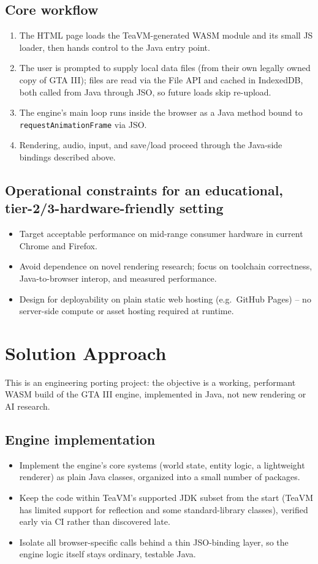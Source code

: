\documentclass[11pt]{article}
\begin{document}
\subsection{Core workflow}
\begin{enumerate}[itemsep=2pt]
  \item The HTML page loads the TeaVM-generated WASM module and its small JS loader, then hands control to the Java entry point.
  \item The user is prompted to supply local data files (from their own legally owned copy of GTA III); files are read via the File API and cached in IndexedDB, both called from Java through JSO, so future loads skip re-upload.
  \item The engine's main loop runs inside the browser as a Java method bound to \texttt{requestAnimationFrame} via JSO.
  \item Rendering, audio, input, and save/load proceed through the Java-side bindings described above.
\end{enumerate}

\subsection{Operational constraints for an educational, tier-2/3-hardware-friendly setting}
\begin{itemize}[itemsep=2pt]
  \item Target acceptable performance on mid-range consumer hardware in current Chrome and Firefox.
  \item Avoid dependence on novel rendering research; focus on toolchain correctness, Java-to-browser interop, and measured performance.
  \item Design for deployability on plain static web hosting (e.g.\ GitHub Pages) -- no server-side compute or asset hosting required at runtime.
\end{itemize}

\section{Solution Approach}
This is an engineering porting project: the objective is a working, performant WASM build of the GTA III engine, implemented in Java, not new rendering or AI research.

\subsection{Engine implementation}
\begin{itemize}[itemsep=2pt]
  \item Implement the engine's core systems (world state, entity logic, a lightweight renderer) as plain Java classes, organized into a small number of packages.
  \item Keep the code within TeaVM's supported JDK subset from the start (TeaVM has limited support for reflection and some standard-library classes), verified early via CI rather than discovered late.
  \item Isolate all browser-specific calls behind a thin JSO-binding layer, so the engine logic itself stays ordinary, testable Java.
\end{itemize}
\end{document}
